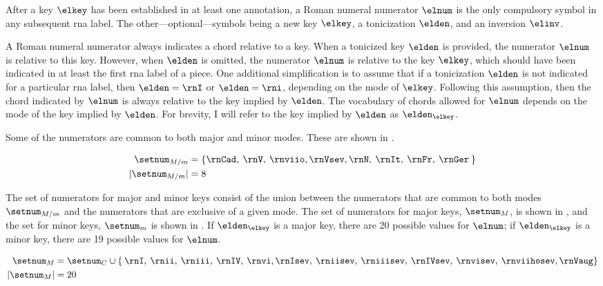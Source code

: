 
After a key $\elkey$ has been established in at least one
annotation, a Roman numeral numerator $\elnum$ is the only
compulsory symbol in any subsequent \gls{rna} label. The
other---optional---symbols being a new key $\elkey$, a
tonicization $\elden$, and an inversion $\elinv$.

A Roman numeral numerator always indicates a chord relative
to a key. When a tonicized key $\elden$ is provided, the
numerator $\elnum$ is relative to this key. However, when
$\elden$ is omitted, the numerator $\elnum$ is relative to
the key $\elkey$, which should have been indicated in at
least the first \gls{rna} label of a piece. One additional
simplification is to assume that if a tonicization $\elden$
is not indicated for a particular \gls{rna} label, then
$\elden = \rnI$ or $\elden = \rni$, depending on the mode of
$\elkey$. Following this assumption, then the chord
indicated by $\elnum$ is always relative to the key implied
by $\elden$. The vocabulary of chords allowed for $\elnum$
depends on the mode of the key implied by $\elden$. For
brevity, I will refer to the key implied by $\elden$ as
$\elden_{\elkey}$.

Some of the numerators are common to both major and minor
modes. These are shown in . 

\begin{equation}
    \label{eq:common_numerators}
    \begin{split}
    \setnum_{M/m} &= \{ \rnCad, \: \rnV, \: \rnviio,
    \rnVsev, \rnN, \: \rnIt, \: \rnFr, \: \rnGer \: \} \\
    | \setnum_{M/m} | &= 8
    \end{split}
\end{equation}

The set of numerators for major and minor keys consist of
the union between the numerators that are common to both
modes $\setnum_{M/m}$ and the numerators that are exclusive
of a given mode. The set of numerators for major keys,
$\setnum_{M}$, is shown in , and the
set for minor keys, $\setnum_{m}$ is shown in
. If $\elden_{\elkey}$ is a major
key, there are 20 possible values for $\elnum$; if
$\elden_{\elkey}$ is a minor key, there are 19 possible
values for $\elnum$.

\begin{equation}
    \label{eq:major_numerators}
    \begin{split}
    \setnum_{M} &= \setnum_{C} \cup \{ \: \rnI, \: \rnii, \: 
    \rniii, \: \rnIV, \: \rnvi, \rnIsev, \: \rniisev, \: 
    \rniiisev, \: \rnIVsev, \: \rnvisev, \: \rnviihosev, \rnVaug \} \\
    | \setnum_{M} | &= 20
    \end{split}
\end{equation}

